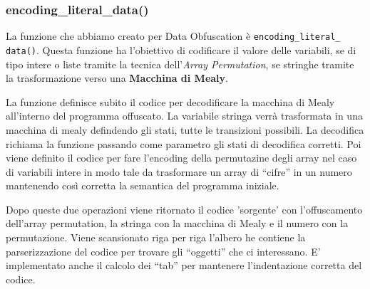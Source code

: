 \documentclass[a4paper,oneside,openright,titlepage,10pt,footinclude,headinclude]{scrbook}
\begin{document}
\subsubsection{encoding\_literal\_data()}

La funzione che abbiamo creato per Data Obfuscation è \texttt{encoding\_literal\_\\data()}. Questa funzione ha l'obiettivo di codificare il valore delle variabili, se di tipo intere o liste tramite la tecnica dell'\textit{Array Permutation}, se stringhe tramite la trasformazione verso una \textbf{Macchina di Mealy}.

La funzione definisce subito il codice per decodificare la macchina di Mealy all'interno del programma offuscato. La variabile stringa verrà trasformata in una macchina di mealy defindendo gli stati, tutte le transizioni possibili. La decodifica richiama la funzione passando come parametro gli stati di decodifica corretti.
Poi viene definito il codice per fare l'encoding della permutazine degli array nel caso di variabili intere in modo tale da trasformare un array di ``cifre'' in un numero mantenendo così corretta la semantica del programma iniziale.

Dopo queste due operazioni viene ritornato il codice 'sorgente' con l'offuscamento dell'array permutation, la stringa con la macchina di Mealy e il numero con la permutazione. Viene scansionato riga per riga l'albero he contiene la parserizzazione del codice per trovare gli ``oggetti'' che ci interessano. E' implementato anche il calcolo dei ``tab'' per mantenere l'indentazione corretta del codice.
\end{document}
